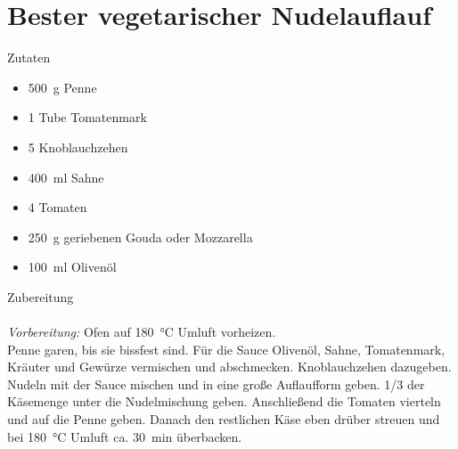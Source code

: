 \section*{Bester vegetarischer Nudelauflauf}
\ihead{}\ohead{}
\cfoot{}
{\Large Zutaten}
\begin{multicols}{2}
\begin{itemize}
    \item \SI{500}{g} Penne
    \item \num{1} Tube Tomatenmark
    \item \num{5} Knoblauchzehen
    \item \SI{400}{ml} Sahne
    \item \num{4} Tomaten
    \item \SI{250}{g} geriebenen Gouda oder Mozzarella
    \item \SI{100}{ml} Olivenöl
\end{itemize}
\end{multicols}
\noindent
{\Large Zubereitung}\\
\\
\textit{Vorbereitung:} Ofen auf \SI{180}{\celsius} Umluft vorheizen.\\
Penne garen, bis sie bissfest sind.
Für die Sauce Olivenöl, Sahne, Tomatenmark, Kräuter und Gewürze vermischen und abschmecken.
Knoblauchzehen dazugeben.
Nudeln mit der Sauce mischen und in eine große Auflaufform geben.
\num{1/3} der Käsemenge unter die Nudelmischung geben.
Anschließend die Tomaten vierteln und auf die Penne geben. 
Danach den restlichen Käse eben drüber streuen und bei \SI{180}{\celsius} Umluft ca. \SI{30}{min} überbacken.
